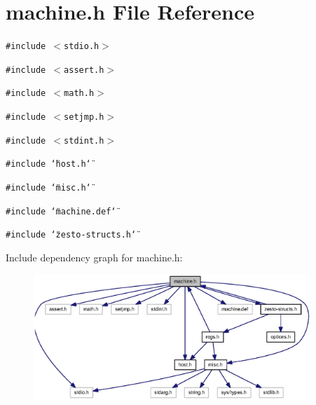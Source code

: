 \section{machine.h File Reference}
\label{machine_8h}
{\tt \#include $<$stdio.h$>$}\par
{\tt \#include $<$assert.h$>$}\par
{\tt \#include $<$math.h$>$}\par
{\tt \#include $<$setjmp.h$>$}\par
{\tt \#include $<$stdint.h$>$}\par
{\tt \#include \char`\"{}host.h\char`\"{}}\par
{\tt \#include \char`\"{}misc.h\char`\"{}}\par
{\tt \#include \char`\"{}machine.def\char`\"{}}\par
{\tt \#include \char`\"{}zesto-structs.h\char`\"{}}\par


Include dependency graph for machine.h:\nopagebreak
\begin{figure}[H]
\begin{center}
\leavevmode
\includegraphics[width=296pt]{machine_8h__incl}
\end{center}
\end{figure}


